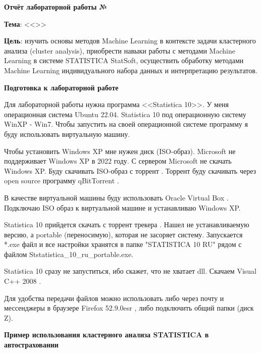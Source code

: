 \begin{center}
  \textbf{Отчёт лабораторной работы №\envReportLabNumber}
\end{center}

\textbf{Тема}:
<<\envReportTitle>>

\textbf{Цель}:
изучить основы методов Machine Learning в контексте задачи кластерного анализа (cluster analysis),
приобрести навыки работы с методами Machine Learning в системе STATISTICA StatSoft,
осуществить обработку методами Machine Learning индивидуального набора данных и интерпретацию результатов.


{}

\begin{center}
  \textbf{Подготовка к лабораторной работе}
\end{center}

Для лабораторной работы нужна программа <<Statistica 10>>.
У меня операционная система Ubuntu 22.04.
Statistica 10 под операционную систему WinXP - Win7.
Чтобы запустить на своей операционной системе программу я буду использовать виртуальную машину.

Чтобы установить Windows XP мне нужен диск (ISO-образ).
Microsoft не поддерживает Windows XP в 2022 году.
С сервером Microsoft не скачать Windows XP.
Буду скачивать ISO-образ с торрент \cite{TorrentWinXP}.
Торрент буду скачивать через open source программу qBitTorrent \cite{downloadQBitTorrent}.

В качестве виртуальной машины буду использовать Oracle Virtual Box \cite{downloadVirtualBox}.
Подключаю ISO образ к виртуальной машине и устанавливаю Windows XP.

Statistica 10 прийдется скачать с торрент трекера \cite{downloadStatistica10}.
Нашел не устанавливаемую версию, а portable (переносимую), которая не засоряет систему.
Запускается *.exe файл и все настройки хранятся в папке "STATISTICA 10 RU" рядом с файлом Ststatistica\_10\_ru\_portable.exe. 

Statistica 10 сразу не запуститься, ибо скажет, что не хватает dll.
Скачаем Visual C++ 2008 \cite{downloadVisualCpp2008}.

Для удобства передачи файлов можно использовать либо через почту и мессенджеры в браузере Firefox 52.9.0esr \cite{downloadFirefox5290esr},
либо подключить общий папки (диск Z).

\begin{center}
  \textbf{Пример использования кластерного анализа STATISTICA в автостраховании}
\end{center}

